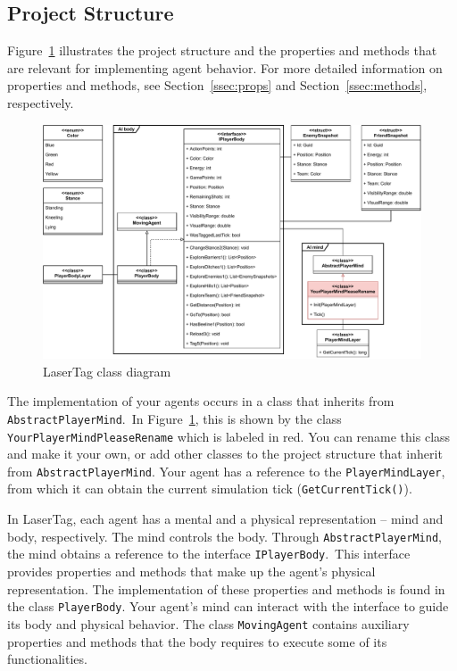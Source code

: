 \documentclass[a4paper,english,DIV=16,11pt,parskip=half,dvipsnames,listof=totoc,index=totoc,bibliography=totoc]{scrartcl}
\begin{document}
\subsection{Project Structure} \label{ssec:projStruc}
%
Figure~\ref{fig:classdiag} illustrates the project structure and the properties and methods that are relevant for implementing agent behavior. For more detailed information on properties and methods, see Section~\ref{ssec:props} and Section~\ref{ssec:methods}, respectively.
%
\begin{figure}[H]
  \centering
  \includegraphics[width=1.0\textwidth,height=0.5\textheight,keepaspectratio]{img/LaserTagStructure.pdf}
  \caption{LaserTag class diagram}
  \label{fig:classdiag}
\end{figure}
%
The implementation of your agents occurs in a class that inherits from \texttt{AbstractPlayerMind}.~In Figure~\ref{fig:classdiag}, this is shown by the class \texttt{YourPlayerMindPleaseRename} which is labeled in red. You can rename this class and make it your own, or add other classes to the project structure that inherit from \texttt{AbstractPlayerMind}. Your agent has a reference to the \texttt{PlayerMindLayer}, from which it can obtain the current simulation tick (\texttt{GetCurrentTick()}).

In LaserTag, each agent has a mental and a physical representation -- mind and body, respectively. The mind controls the body. Through \texttt{AbstractPlayerMind}, the mind obtains a reference to the interface \texttt{IPlayerBody}.~This interface provides properties and methods that make up the agent's physical representation. The implementation of these properties and methods is found in the class \texttt{PlayerBody}. Your agent's mind can interact with the interface to guide its body and physical behavior. The class \texttt{MovingAgent} contains auxiliary properties and methods that the body requires to execute some of its functionalities.
\end{document}
